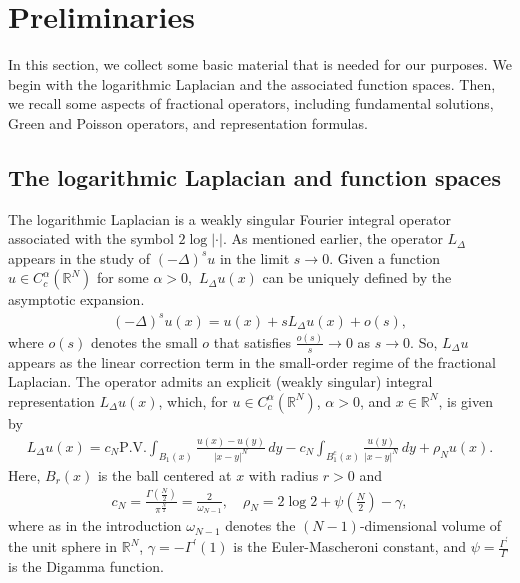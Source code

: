 \documentclass[notitlepage,11pt,reqno]{amsart}
\theoremstyle{definition}
\numberwithin{equation}{section}
\newcommand{\RR}{\mathds{R}}
\begin{document}
\section{Preliminaries}\label{priliminary}
In this section, we collect some basic material that is needed for our purposes. We begin with the logarithmic Laplacian and the associated function spaces. Then, we recall some aspects of fractional operators, including fundamental solutions, Green and Poisson operators, and representation formulas.

\subsection{The logarithmic Laplacian and function spaces} The logarithmic Laplacian is a weakly singular Fourier integral operator associated with the symbol $2 \log |\cdot|.$ As mentioned earlier, the operator $L_{\Delta}$ appears in the study of $(-\Delta)^su$ in the limit $s \to 0$. Given a function $u \in C^{\alpha}_c(\RR^N)$ for some $\alpha>0,$ $L_{\Delta}u(x)$ can be uniquely defined by the asymptotic expansion.
\begin{align*}
    (-\Delta)^s u(x)=u(x)+sL_{\Delta}u(x)+o(s),
\end{align*}
where $o(s)$ denotes the small $o$ that satisfies $\frac{o(s)}{s} \to 0$ as $s\to 0.$ So, $L_{\Delta}u$ appears as the linear correction term in the small-order regime of the fractional Laplacian. The operator admits an explicit (weakly singular) integral representation $L_{\Delta}u(x)$, which, for $u\in C^{\alpha}_c(\RR^N)$, $\alpha>0$, and $x \in \RR^N$, is given by
\begin{align}\label{integral rep_log}
    L_{\Delta}u(x)=c_N \text{P.V.}\int_{B_1(x)}\frac{u(x)-u(y)}{|x-y|^N}\, dy-c_N\int_{B^c_1(x)}\frac{u(y)}{|x-y|^{N}}\, dy+\rho_N u(x).
\end{align}
Here, $B_r(x)$ is the ball centered at $x$ with radius $r>0$ and 
\begin{align*}
    c_N=\frac{\Gamma(\frac{N}{2})}{\pi^{\frac{N}{2}}}=\frac{2}{\omega_{N-1}}, \quad \rho_N=2 \log 2+\psi(\frac{N}{2})-\gamma,
\end{align*}
where as in the introduction $\omega_{N-1}$ denotes the $(N-1)$-dimensional volume of the unit sphere in $\RR^N$,  $\gamma=-\Gamma^{\prime}(1)$ is the Euler-Mascheroni constant, and $\psi=\frac{\Gamma^{\prime}}{\Gamma}$ is the Digamma function.
\end{document}
